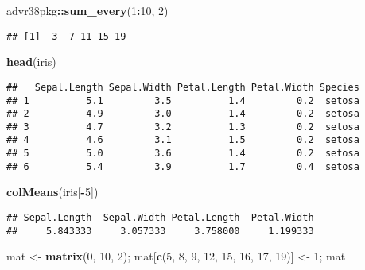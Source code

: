\documentclass[]{article}
\newenvironment{Shaded}{\begin{snugshade}}{\end{snugshade}}
\newcommand{\DecValTok}[1]{\textcolor[rgb]{0.00,0.00,0.81}{#1}}
\newcommand{\KeywordTok}[1]{\textcolor[rgb]{0.13,0.29,0.53}{\textbf{#1}}}
\newcommand{\NormalTok}[1]{#1}
\newcommand{\OperatorTok}[1]{\textcolor[rgb]{0.81,0.36,0.00}{\textbf{#1}}}
\newcommand{\StringTok}[1]{\textcolor[rgb]{0.31,0.60,0.02}{#1}}
\begin{document}
\begin{Shaded}
\begin{Highlighting}[]
\NormalTok{advr38pkg}\OperatorTok{::}\KeywordTok{sum_every}\NormalTok{(}\DecValTok{1}\OperatorTok{:}\DecValTok{10}\NormalTok{, }\DecValTok{2}\NormalTok{)}
\end{Highlighting}
\end{Shaded}

\begin{verbatim}
## [1]  3  7 11 15 19
\end{verbatim}

\begin{Shaded}
\begin{Highlighting}[]
\KeywordTok{head}\NormalTok{(iris)}
\end{Highlighting}
\end{Shaded}

\begin{verbatim}
##   Sepal.Length Sepal.Width Petal.Length Petal.Width Species
## 1          5.1         3.5          1.4         0.2  setosa
## 2          4.9         3.0          1.4         0.2  setosa
## 3          4.7         3.2          1.3         0.2  setosa
## 4          4.6         3.1          1.5         0.2  setosa
## 5          5.0         3.6          1.4         0.2  setosa
## 6          5.4         3.9          1.7         0.4  setosa
\end{verbatim}

\begin{Shaded}
\begin{Highlighting}[]
\KeywordTok{colMeans}\NormalTok{(iris[}\OperatorTok{-}\DecValTok{5}\NormalTok{])}
\end{Highlighting}
\end{Shaded}

\begin{verbatim}
## Sepal.Length  Sepal.Width Petal.Length  Petal.Width 
##     5.843333     3.057333     3.758000     1.199333
\end{verbatim}

\begin{Shaded}
\begin{Highlighting}[]
\NormalTok{mat <-}\StringTok{ }\KeywordTok{matrix}\NormalTok{(}\DecValTok{0}\NormalTok{, }\DecValTok{10}\NormalTok{, }\DecValTok{2}\NormalTok{); mat[}\KeywordTok{c}\NormalTok{(}\DecValTok{5}\NormalTok{, }\DecValTok{8}\NormalTok{, }\DecValTok{9}\NormalTok{, }\DecValTok{12}\NormalTok{, }\DecValTok{15}\NormalTok{, }\DecValTok{16}\NormalTok{, }\DecValTok{17}\NormalTok{, }\DecValTok{19}\NormalTok{)] <-}\StringTok{ }\DecValTok{1}\NormalTok{; mat}
\end{Highlighting}
\end{Shaded}
\end{document}
